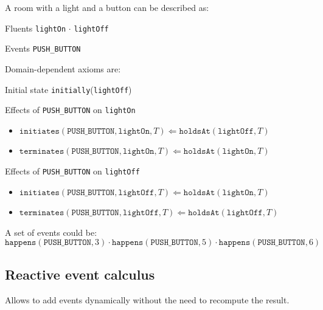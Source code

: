 \begin{example}
    A room with a light and a button can be described as:
    \begin{descriptionlist}
        \item[Fluents] \texttt{lightOn} $\cdot$ \texttt{lightOff}
        \item[Events] \texttt{PUSH\_BUTTON}
    \end{descriptionlist}

    Domain-dependent axioms are:
    \begin{descriptionlist}
        \item[Initial state] \texttt{initially}(\texttt{lightOff}) 
        \item[Effects of \texttt{PUSH\_BUTTON} on \texttt{lightOn}] \phantom{}
            \begin{itemize}
                \item $\texttt{initiates}(\texttt{PUSH\_BUTTON}, \texttt{lightOn}, T) \Leftarrow \texttt{holdsAt}(\texttt{lightOff}, T)$
                \item $\texttt{terminates}(\texttt{PUSH\_BUTTON}, \texttt{lightOn}, T) \Leftarrow \texttt{holdsAt}(\texttt{lightOn}, T)$
            \end{itemize}
        \item[Effects of \texttt{PUSH\_BUTTON} on \texttt{lightOff}] \phantom{}
            \begin{itemize}
                \item $\texttt{initiates}(\texttt{PUSH\_BUTTON}, \texttt{lightOff}, T) \Leftarrow \texttt{holdsAt}(\texttt{lightOn}, T)$
                \item $\texttt{terminates}(\texttt{PUSH\_BUTTON}, \texttt{lightOff}, T) \Leftarrow \texttt{holdsAt}(\texttt{lightOff}, T)$
            \end{itemize}
    \end{descriptionlist}

    A set of events could be:
    \[ \texttt{happens}(\texttt{PUSH\_BUTTON}, 3) \cdot \texttt{happens}(\texttt{PUSH\_BUTTON}, 5) \cdot \texttt{happens}(\texttt{PUSH\_BUTTON}, 6) \]
\end{example}


\subsection{Reactive event calculus}

Allows to add events dynamically without the need to recompute the result.



